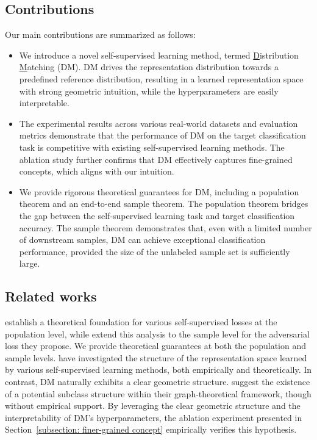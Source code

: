 \subsection{Contributions}\label{subsection: contributions}
Our main contributions are summarized as follows:
\begin{itemize}
    \item We introduce a novel self-supervised learning method, termed \underline{D}istribution \underline{M}atching (DM). DM drives the representation distribution towards a predefined reference distribution, resulting in a learned representation space with strong geometric intuition, while the hyperparameters are easily interpretable.   
    \item The experimental results across various real-world datasets and evaluation metrics demonstrate that the performance of DM on the target classification task is competitive with existing self-supervised learning methods. The ablation study further confirms that DM effectively captures fine-grained concepts, which aligns with our intuition. 
    \item We provide rigorous theoretical guarantees for DM, including a population theorem and an end-to-end sample theorem. The population theorem bridges the gap between the self-supervised learning task and target classification accuracy. The sample theorem demonstrates that, even with a limited number of downstream samples, DM can achieve exceptional classification performance, provided the size of the unlabeled sample set is sufficiently large.
\end{itemize}

\subsection{Related works}\label{subsection: related works}
\citet{huang2023towards} establish a theoretical foundation for various self-supervised losses at the population level, while \citet{duan2024unsupervisedtransferlearningadversarial} extend this analysis to the sample level for the adversarial loss they propose. We provide theoretical guarantees at both the population and sample levels. \citet{wang2020understanding, Awasthi2022DoMN, huang2023towards, duan2024unsupervisedtransferlearningadversarial} have investigated the structure of the representation space learned by various self-supervised learning methods, both empirically and theoretically. In contrast, DM naturally exhibits a clear geometric structure. \citet{haochen2021spectral, haochen2022beyond, haochen2023theoretical} suggest the existence of a potential subclass structure within their graph-theoretical framework, though without empirical support. By leveraging the clear geometric structure and the interpretability of DM's hyperparameters, the ablation experiment presented in Section~\ref{subsection: finer-grained concept} empirically verifies this hypothesis.


